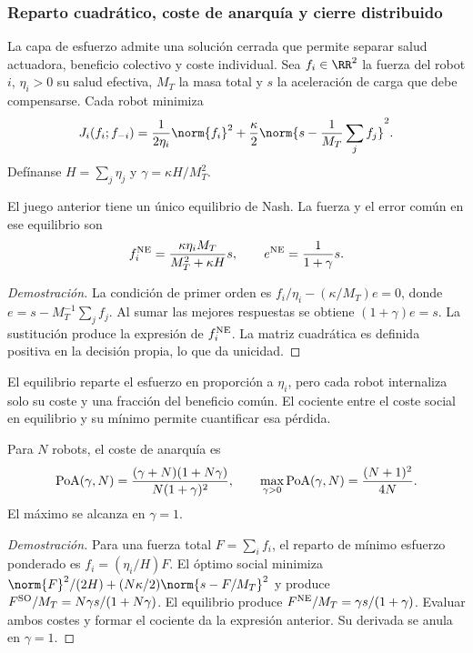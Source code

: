 \subsubsection{Reparto cuadrático, coste de anarquía y cierre distribuido}

La capa de esfuerzo admite una solución cerrada que permite separar salud actuadora,
beneficio colectivo y coste individual. Sea $f_i\in\RR^2$ la fuerza del robot $i$,
$\eta_i>0$ su salud efectiva, $M_T$ la masa total y $s$ la aceleración de carga que debe
compensarse. Cada robot minimiza
\[
 J_i(f_i;f_{-i})=
 \frac{1}{2\eta_i}\norm{f_i}^2+
 \frac{\kappa}{2}\norm{s-\frac{1}{M_T}\sum_j f_j}^2.
\]
Defínanse $H=\sum_j\eta_j$ y $\gamma=\kappa H/M_T^2$.

\begin{proposicion}
El juego anterior tiene un único equilibrio de Nash. La fuerza y el error común en ese
equilibrio son
\[
 f_i^{\rm NE}=\frac{\kappa\eta_i M_T}{M_T^2+\kappa H}s,
 \qquad
 e^{\rm NE}=\frac{1}{1+\gamma}s.
\]
\end{proposicion}

\begin{proof}[Demostración]
La condición de primer orden es
$f_i/\eta_i-(\kappa/M_T)e=0$, donde
$e=s-M_T^{-1}\sum_j f_j$. Al sumar las mejores respuestas se obtiene
$(1+\gamma)e=s$. La sustitución produce la expresión de $f_i^{\rm NE}$. La matriz
cuadrática es definida positiva en la decisión propia, lo que da unicidad.
\end{proof}

El equilibrio reparte el esfuerzo en proporción a $\eta_i$, pero cada robot internaliza
solo su coste y una fracción del beneficio común. El cociente entre el coste social en
equilibrio y su mínimo permite cuantificar esa pérdida.

\begin{proposicion}
Para $N$ robots, el coste de anarquía es
\[
 {\rm PoA}(\gamma,N)=
 \frac{(\gamma+N)(1+N\gamma)}{N(1+\gamma)^2},
 \qquad
 \max_{\gamma>0}{\rm PoA}(\gamma,N)=\frac{(N+1)^2}{4N}.
\]
El máximo se alcanza en $\gamma=1$.
\end{proposicion}

\begin{proof}[Demostración]
Para una fuerza total $F=\sum_i f_i$, el reparto de mínimo esfuerzo ponderado es
$f_i=(\eta_i/H)F$. El óptimo social minimiza
$\norm{F}^2/(2H)+(N\kappa/2)\norm{s-F/M_T}^2$ y produce
$F^{\rm SO}/M_T=N\gamma s/(1+N\gamma)$. El equilibrio produce
$F^{\rm NE}/M_T=\gamma s/(1+\gamma)$. Evaluar ambos costes y formar el cociente da la
expresión anterior. Su derivada se anula en $\gamma=1$.
\end{proof}

